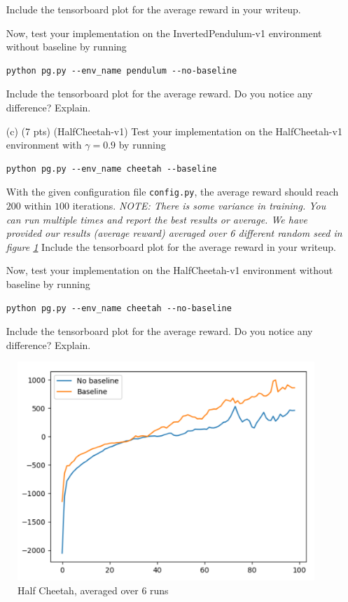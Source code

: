 \documentclass{article}
\begin{document}
\begin{enumerate}
Include the tensorboard plot for the average reward in your writeup.

Now, test your implementation on the InvertedPendulum-v1 environment without baseline by running
\begin{tcolorbox}
\begin{verbatim}
python pg.py --env_name pendulum --no-baseline
\end{verbatim}
\end{tcolorbox}
Include the tensorboard plot for the average reward. Do you notice any difference? Explain.

\item[(c) (7 pts)](HalfCheetah-v1)
Test your implementation on the HalfCheetah-v1 environment with $\gamma = 0.9$ by running
\begin{tcolorbox}
\begin{verbatim}
python pg.py --env_name cheetah --baseline
\end{verbatim}
\end{tcolorbox}

With the given configuration file \texttt{config.py}, the average reward should reach $200$ within $100$ iterations. \emph{NOTE: There is some variance in training. You can run multiple times and report the best results or average. We have provided our results (average reward) averaged over 6 different random seed in figure \ref{fig:half}} Include the tensorboard plot for the average reward in your writeup.

Now, test your implementation on the HalfCheetah-v1 environment without baseline by running
\begin{tcolorbox}
\begin{verbatim}
python pg.py --env_name cheetah --no-baseline
\end{verbatim}
\end{tcolorbox}
Include the tensorboard plot for the average reward. Do you notice any difference? Explain.
\end{enumerate}
\begin{figure}[h]
    \centering
    \includegraphics[width=0.25\linewidth]{halfcheetah.png}
    \caption{Half Cheetah, averaged over 6 runs}
    \label{fig:half}
\end{figure}
 
\end{document}
